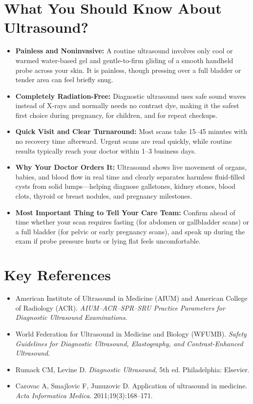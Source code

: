 \section{What You Should Know About Ultrasound?}

\begin{itemize}
    \item \textbf{Painless and Noninvasive:} A routine ultrasound involves only cool or warmed water-based gel and gentle-to-firm gliding of a smooth handheld probe across your skin. It is painless, though pressing over a full bladder or tender area can feel briefly snug.
    \item \textbf{Completely Radiation-Free:} Diagnostic ultrasound uses safe sound waves instead of X-rays and normally needs no contrast dye, making it the safest first choice during pregnancy, for children, and for repeat checkups.
    \item \textbf{Quick Visit and Clear Turnaround:} Most scans take 15--45 minutes with no recovery time afterward. Urgent scans are read quickly, while routine results typically reach your doctor within 1--3 business days.
    \item \textbf{Why Your Doctor Orders It:} Ultrasound shows live movement of organs, babies, and blood flow in real time and clearly separates harmless fluid-filled cysts from solid lumps---helping diagnose gallstones, kidney stones, blood clots, thyroid or breast nodules, and pregnancy milestones.
    \item \textbf{Most Important Thing to Tell Your Care Team:} Confirm ahead of time whether your scan requires fasting (for abdomen or gallbladder scans) or a full bladder (for pelvic or early pregnancy scans), and speak up during the exam if probe pressure hurts or lying flat feels uncomfortable.
\end{itemize}

\section{Key References}

\begin{itemize}
    \item American Institute of Ultrasound in Medicine (AIUM) and American College of Radiology (ACR). \textit{AIUM--ACR--SPR--SRU Practice Parameters for Diagnostic Ultrasound Examinations}.
    \item World Federation for Ultrasound in Medicine and Biology (WFUMB). \textit{Safety Guidelines for Diagnostic Ultrasound, Elastography, and Contrast-Enhanced Ultrasound}.
    \item Rumack CM, Levine D. \textit{Diagnostic Ultrasound}, 5th ed. Philadelphia: Elsevier.
    \item Carovac A, Smajlovic F, Junuzovic D. Application of ultrasound in medicine. \textit{Acta Informatica Medica}. 2011;19(3):168--171.
\end{itemize}
